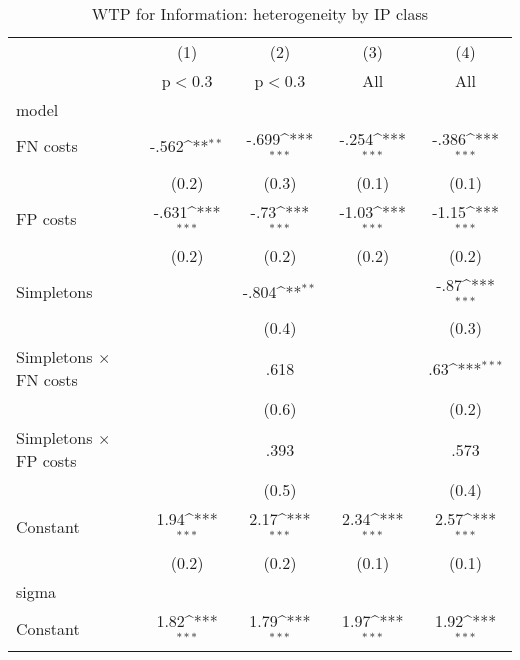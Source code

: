 \begin{table}[htbp]\centering
\def\sym#1{\ifmmode^{#1}\else\(^{#1}\)\fi}
\caption{WTP for Information: heterogeneity by IP class}
\begin{tabular}{l*{4}{c}}
\hline\hline
                &\multicolumn{1}{c}{(1)}&\multicolumn{1}{c}{(2)}&\multicolumn{1}{c}{(3)}&\multicolumn{1}{c}{(4)}\\
                &\multicolumn{1}{c}{p$<$0.3}&\multicolumn{1}{c}{p$<$0.3}&\multicolumn{1}{c}{All}&\multicolumn{1}{c}{All}\\
\hline
model           &                  &                  &                  &                  \\
FN costs        &    -.562\sym{**} &    -.699\sym{***}&    -.254\sym{***}&    -.386\sym{***}\\
                &    (0.2)         &    (0.3)         &    (0.1)         &    (0.1)         \\
FP costs        &    -.631\sym{***}&     -.73\sym{***}&    -1.03\sym{***}&    -1.15\sym{***}\\
                &    (0.2)         &    (0.2)         &    (0.2)         &    (0.2)         \\
Simpletons      &                  &    -.804\sym{**} &                  &     -.87\sym{***}\\
                &                  &    (0.4)         &                  &    (0.3)         \\
Simpletons $\times$ FN costs&                  &     .618         &                  &      .63\sym{***}\\
                &                  &    (0.6)         &                  &    (0.2)         \\
Simpletons $\times$ FP costs&                  &     .393         &                  &     .573         \\
                &                  &    (0.5)         &                  &    (0.4)         \\
Constant        &     1.94\sym{***}&     2.17\sym{***}&     2.34\sym{***}&     2.57\sym{***}\\
                &    (0.2)         &    (0.2)         &    (0.1)         &    (0.1)         \\
\hline
sigma           &                  &                  &                  &                  \\
Constant        &     1.82\sym{***}&     1.79\sym{***}&     1.97\sym{***}&     1.92\sym{***}\\

\end{tabular}
\end{table}
